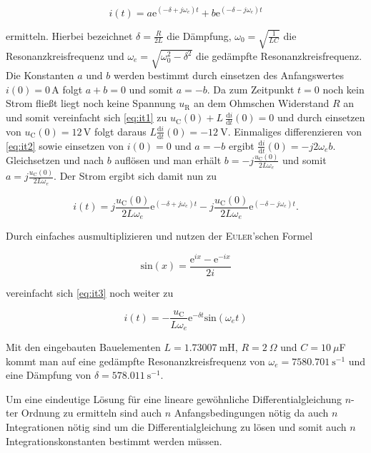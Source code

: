 	\begin{equation}
			i(t) = a\mathrm{e}^{(-\delta +j\omega_e)t} + b\mathrm{e}^{(-\delta - j\omega_e)t}
			\label{eq:it2}
	\end{equation}
	
	ermitteln. Hierbei bezeichnet $\delta = \frac{R}{2L}$ die Dämpfung, $\omega_0 = \sqrt{\frac{1}{LC}}$ die Resonanzkreisfrequenz und $\omega_e = \sqrt{\omega_0^2 - \delta^2}$ die gedämpfte Resonanzkreisfrequenz. Die Konstanten $a$ und $b$ werden bestimmt durch einsetzen des Anfangswertes  $i(0) = 0\,$A folgt $a + b = 0$ und somit $a = -b$.\newline
	Da zum Zeitpunkt $t = 0$ noch kein Strom fließt liegt noch keine Spannung $u_\mathrm{R}$ an dem Ohmschen Widerstand $R$ an und somit vereinfacht sich \ref{eq:it1} zu $u_\mathrm{C}(0) +  L\: \frac{\mathrm{d}i}{\mathrm{d}t}(0) = 0$ und durch einsetzen von $u_\mathrm{C}(0) = 12\,$V folgt daraus $L\frac{\mathrm{d}i}{\mathrm{d}t}(0) = -12\:$V. Einmaliges differenzieren von \ref{eq:it2} sowie einsetzen von $ i(0) = 0$ und $a = -b$ ergibt $\frac{\mathrm{d}i}{\mathrm{d}t}(0) = -j2\omega_e b$. Gleichsetzen und nach $b$ auflösen und man erhält $b = -j \frac{u_\mathrm{C}(0)}{2L\omega_e}$ und somit $a = j\frac{u_\mathrm{C}(0)}{2L\omega_e}$. Der Strom ergibt sich damit nun zu 
	
	\begin{equation}
		i(t) = j\frac{u_\mathrm{C}(0)}{2L\omega_e}\mathrm{e}^{(-\delta +j\omega_e)t} - j \frac{u_\mathrm{C}(0)}{2L\omega_e}\mathrm{e}^{(-\delta - j\omega_e)t}.
		\label{eq:it3}
	\end{equation}
	
	Durch einfaches ausmultiplizieren und nutzen der \textsc{Euler}'schen Formel 
	
	\begin{equation*}
		\mathrm{sin}(x) = \frac{\mathrm{e}^{ix} - \mathrm{e}^{-ix}}{2i}
	\end{equation*}
	
	vereinfacht sich \ref{eq:it3} noch weiter zu
	
	\begin{equation*}
		i(t) = -\frac{u_\mathrm{C}}{L\omega_e}\mathrm{e}^{-\delta t}\mathrm{sin}(\omega_et)
	\end{equation*}
	
	Mit den eingebauten Bauelementen $L = 1.73007\:$mH, $R = 2\:\Omega$ und $C = 10 \: \mu $F kommt man auf eine gedämpfte Resonanzkreisfrequenz von $\omega_e = 7580.701\:\mathrm{s}^{-1}$ und eine Dämpfung von $\delta = 578.011\:\mathrm{s}^{-1}$.\newline
	
	Um eine eindeutige Lösung für eine lineare gewöhnliche Differentialgleichung $n$-ter Ordnung zu ermitteln sind auch $n$ Anfangsbedingungen nötig da auch $n$ Integrationen nötig sind um die Differentialgleichung zu lösen und somit auch $n$ Integrationskonstanten bestimmt werden müssen.


